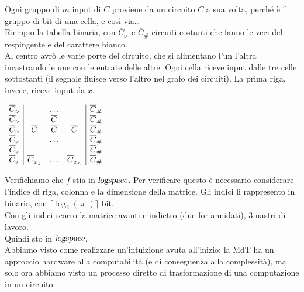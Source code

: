 \documentclass[10pt]{book}
\begin{document}
Ogni gruppo di $m$ input di $\overline{C}$ proviene da un circuito $\overline{C}$ a sua volta, perché è il gruppo di bit di una cella, e così via\ldots\\
Riempio la tabella binaria, con $\overline{C}_\triangleright$ e $\overline{C}_\#$ circuiti costanti che fanno le veci del respingente e del carattere bianco.\\
Al centro avrò le varie porte del circuito, che si alimentano l'un l'altra incastrando le une con le entrate delle altre. Ogni cella riceve input dalle tre celle sottostanti (il segnale fluisce verso l'altro nel grafo dei circuiti). La prima riga, invece, riceve input da $x$.
\begin{center}
	\begin{math}
		\begin{array}{c | c c c | c}
			\overline{C}_\triangleright & &\ldots & & \overline{C}_\#\\
			\overline{C}_\triangleright & & \overline{C} & & \overline{C}_\#\\
			\overline{C}_\triangleright & \overline{C} & \overline{C} & \overline{C} & \overline{C}_\#\\
			\overline{C}_\triangleright & &\ldots & & \overline{C}_\#\\
			\overline{C}_\triangleright & & & & \overline{C}_\#\\
			\overline{C}_\triangleright & \overline{C}_{x_1} & \ldots & \overline{C}_{x_n} & \overline{C}_\#\\
		\end{array}
	\end{math}
\end{center}
Verifichiamo che $f$ stia in $\textsl{logspace}$. Per verificare questo è necessario considerare l'indice di riga, colonna e la dimensione della matrice. Gli indici li rappresento in binario, con $\lceil\log_2(|x|)\rceil$ bit.\\
Con gli indici scorro la matrice avanti e indietro (due for annidati), 3 nastri di lavoro.\\
Quindi sto in $\textsl{logspace}$.\\
Abbiamo visto come realizzare un'intuizione avuta all'inizio: la MdT ha un approccio hardware alla computabilità (e di conseguenza alla complessità), ma solo ora abbiamo visto un processo diretto di trasformazione di una computazione in un circuito.
\end{document}
